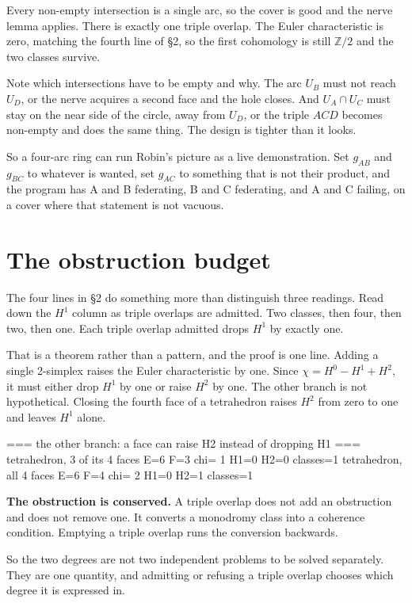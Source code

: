 \documentclass[11pt,a4paper]{article}
\begin{document}
Every non-empty intersection is a single arc, so the cover is good and the nerve
lemma applies. There is exactly one triple overlap. The Euler characteristic is
zero, matching the fourth line of \S2, so the first cohomology is still
$\mathbb{Z}/2$ and the two classes survive.

Note which intersections have to be empty and why. The arc $U_B$ must not reach
$U_D$, or the nerve acquires a second face and the hole closes. And $U_A \cap
U_C$ must stay on the near side of the circle, away from $U_D$, or the triple
$ACD$ becomes non-empty and does the same thing. The design is tighter than it
looks.


So a four-arc ring can run Robin's picture as a live demonstration. Set
$g_{AB}$ and $g_{BC}$ to whatever is wanted, set $g_{AC}$ to something that is
not their product, and the program has A and B federating, B and C federating,
and A and C failing, on a cover where that statement is not vacuous.

\section{The obstruction budget}

The four lines in \S2 do something more than distinguish three readings. Read
down the $H^1$ column as triple overlaps are admitted. Two classes, then four,
then two, then one. Each triple overlap admitted drops $H^1$ by exactly one.

That is a theorem rather than a pattern, and the proof is one line. Adding a
single 2-simplex raises the Euler characteristic by one. Since
$\chi = H^0 - H^1 + H^2$, it must either drop $H^1$ by one or raise $H^2$ by
one. The other branch is not hypothetical. Closing the fourth face of a
tetrahedron raises $H^2$ from zero to one and leaves $H^1$ alone.

\begin{term}
=== the other branch: a face can raise H2 instead of dropping H1 ===
  tetrahedron, 3 of its 4 faces                E=6 F=3  chi=  1   H1=0  H2=0   classes=1
  tetrahedron, all 4 faces                     E=6 F=4  chi=  2   H1=0  H2=1   classes=1
\end{term}

\begin{sectionbox}
\textbf{The obstruction is conserved.} A triple overlap does not add an
obstruction and does not remove one. It converts a monodromy class into a
coherence condition. Emptying a triple overlap runs the conversion backwards.

So the two degrees are not two independent problems to be solved separately.
They are one quantity, and admitting or refusing a triple overlap chooses which
degree it is expressed in.
\end{sectionbox}
\end{document}
